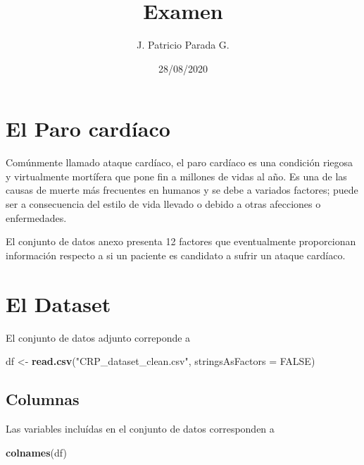 \documentclass[
  10pt,
  spanish,
]{article}
\title{Examen}
\author{J. Patricio Parada G.}
\date{28/08/2020}
\newenvironment{Shaded}{\begin{snugshade}}{\end{snugshade}}
\newcommand{\DataTypeTok}[1]{\textcolor[rgb]{0.13,0.29,0.53}{#1}}
\newcommand{\KeywordTok}[1]{\textcolor[rgb]{0.13,0.29,0.53}{\textbf{#1}}}
\newcommand{\NormalTok}[1]{#1}
\newcommand{\OtherTok}[1]{\textcolor[rgb]{0.56,0.35,0.01}{#1}}
\newcommand{\StringTok}[1]{\textcolor[rgb]{0.31,0.60,0.02}{#1}}
\begin{document}
\maketitle

{
\setcounter{tocdepth}{2}
\tableofcontents
}
\hypertarget{el-paro-carduxedaco}{%
\section{El Paro cardíaco}\label{el-paro-carduxedaco}}

Comúnmente llamado ataque cardíaco, el paro cardíaco es una condición
riegosa y virtualmente mortífera que pone fin a millones de vidas al
año. Es una de las causas de muerte más frecuentes en humanos y se debe
a variados factores; puede ser a consecuencia del estilo de vida llevado
o debido a otras afecciones o enfermedades.

El conjunto de datos anexo presenta 12 factores que eventualmente
proporcionan información respecto a si un paciente es candidato a sufrir
un ataque cardíaco.

\hypertarget{el-dataset}{%
\section{El Dataset}\label{el-dataset}}

El conjunto de datos adjunto correponde a

\begin{Shaded}
\begin{Highlighting}[]
\NormalTok{df \textless{}{-}}\StringTok{ }\KeywordTok{read.csv}\NormalTok{(}\StringTok{"CRP\_dataset\_clean.csv"}\NormalTok{, }\DataTypeTok{stringsAsFactors =} \OtherTok{FALSE}\NormalTok{)}
\end{Highlighting}
\end{Shaded}

\hypertarget{columnas}{%
\subsection{Columnas}\label{columnas}}

Las variables incluídas en el conjunto de datos corresponden a

\begin{Shaded}
\begin{Highlighting}[]
\KeywordTok{colnames}\NormalTok{(df)}
\end{Highlighting}
\end{Shaded}
\end{document}
